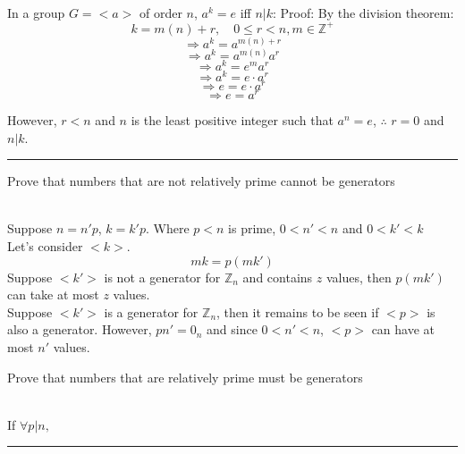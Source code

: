 \documentclass[11pt]{article}
\begin{document}
\begin{solution} \hfill \\
In a group $G=<a>$ of order $n$, $a^k=e$ iff $n|k$:
Proof:
By the division theorem:
$$k = m(n)+r, \quad 0\leq r<n, m\in \mathbb{Z}^+$$
$$\Rightarrow a^k = a^{m(n)+r}$$
$$\Rightarrow a^k = a^{m(n)}a^{r}$$
$$\Rightarrow a^k = e^{m}a^{r}$$
$$\Rightarrow a^k = e\cdot a^{r}$$
$$\Rightarrow e = e\cdot a^{r}$$
$$\Rightarrow e = a^{r}$$

However, $r<n$ and $n$ is the least positive integer such that $a^n=e$, $\therefore$ $r = 0$ and $n|k$.
\end{solution}
\vspace{6pt}
\hrule
\vspace{6pt}

Prove that numbers that are not relatively prime cannot be generators
\begin{solution} \hfill \\
    Suppose $n=n'p$, $k=k'p$. Where $p < n$ is prime, $0< n'<n$ and $0<k'<k$\\
    Let's consider $<k>$.
    $$mk=p(mk')$$
    Suppose $<k'>$ is not a generator for $\mathbb{Z}_n$ and contains $z$ values, then $p(mk')$ can take at most $z$ values.\\
    Suppose $<k'>$ is a generator for $\mathbb{Z}_n$, then it remains to be seen if $<p>$ is also a generator. However, $pn'=0_n$ and since  $0<n'<n$, $<p>$ can have at most $n'$ values.
\end{solution}
Prove that numbers that are relatively prime must be generators
\begin{solution} \hfill \\
    If $\forall p|n, $
\end{solution}
\vspace{6pt}
\hrule
\vspace{6pt}
\end{document}
